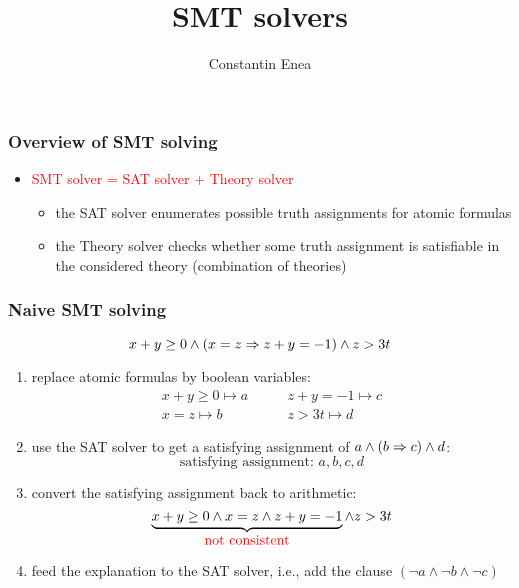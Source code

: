 \documentclass[smaller]{beamer}
\title[SMT solvers]{SMT solvers}
\author{Constantin Enea}
\institute[IRIF]{IRIF, University Paris Diderot - Paris 7}
\date{ }
\newcommand{\red}[1]{\textcolor{red}{#1}}
\begin{document}
\begin{frame}
	\titlepage
\end{frame}




\begin{frame}
\frametitle{Overview of SMT solving}
\begin{itemize}
\item \red{SMT solver = SAT solver + Theory solver}
\vspace{2mm}
\begin{itemize}
\setlength\itemsep{2ex}
\item the SAT solver enumerates possible truth assignments for atomic formulas
\item the Theory solver checks whether some truth assignment is satisfiable in the
considered theory (combination of theories)
\end{itemize}
\end{itemize}
\end{frame}

\begin{frame}
\frametitle{Naive SMT solving}
\[
x+y\geq 0\land (x=z\Rightarrow z+y=-1)\land z>3t
\]
\begin{enumerate}
\item replace atomic formulas by boolean variables:
\[
\begin{array}{ll}
x+y\geq 0\mapsto a \quad\quad& z+y=-1\mapsto c\\[2mm]
x=z\mapsto b \quad\quad& z>3t \mapsto d
\end{array}
\]
\item use the SAT solver to get a satisfying assignment of $a\land (b\Rightarrow c)\land d$:
\[
\mbox{satisfying assignment: }a,b,c,d
\]
\item convert the satisfying assignment back to arithmetic:
\[
\underbrace{x+y\geq 0\land x=z\land z+y=-1}_{\red{\mbox{not consistent}}}\land z>3t
\]
\item feed the explanation to the SAT solver, i.e., add the clause $(\neg a\land \neg b\land \neg c)$
\end{enumerate}
\end{frame}
\end{document}
